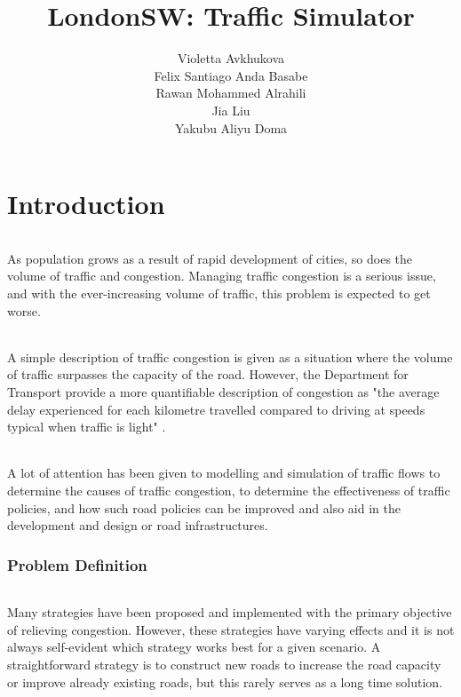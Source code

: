 \documentclass[a4paper,11pt,titlepage]{article}
\begin{document}
\title{LondonSW: Traffic Simulator}
\author{Violetta Avkhukova\\Felix Santiago Anda Basabe\\Rawan Mohammed Alrahili\\Jia Liu\\Yakubu Aliyu Doma}
\maketitle

\part{Introduction}
\paragraph{}
As population grows as a result of rapid development of cities, so does the volume of traffic and congestion. Managing traffic congestion is a serious issue, and  with the ever-increasing volume of traffic, this problem is expected to get worse.
\paragraph{}
A simple description of traffic congestion is given as a situation where the volume of traffic surpasses the capacity of the road. However, the Department for Transport provide a more quantifiable description of congestion as "the average delay experienced for each kilometre travelled compared to driving at speeds typical when traffic is light" \cite{2}.
\paragraph{}
A lot of attention has been given to modelling and simulation of traffic flows to determine the causes of traffic congestion, to determine the effectiveness of traffic policies, and how such road policies can be improved and also aid in the development and design or road infrastructures.

\section{Problem Definition}
\paragraph{}
Many strategies have been proposed and implemented with the primary objective of relieving congestion. However, these strategies have varying effects and it is not always self-evident which strategy works best for a given scenario. A straightforward strategy is to construct new roads to increase the road capacity or improve already existing roads, but  this rarely serves as a long time solution.
\end{document}
